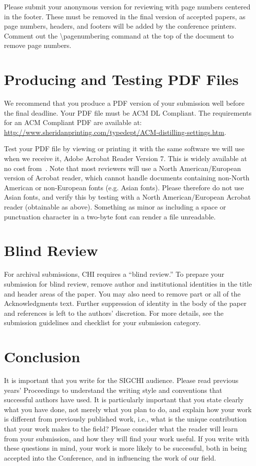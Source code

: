\documentclass{sigchi}
\begin{document}
Please submit your anonymous version for reviewing with page numbers
centered in the footer.  These must be removed in the final version of
accepted papers, as page numbers, headers, and footers will be added
by the conference printers.  Comment out the {\textbackslash}pagenumbering
command at the top of the document to remove page numbers.

\section{Producing and Testing PDF Files}

We recommend that you produce a PDF version of your submission well
before the final deadline.  Your PDF file must be ACM DL
Compliant. The requirements for an ACM Compliant PDF are available at:
{\url{http://www.sheridanprinting.com/typedept/ACM-distilling-settings.htm}}.

Test your PDF file by viewing or printing it with the same software we
will use when we receive it, Adobe Acrobat Reader Version 7. This is
widely available at no cost from~\cite{acrobat}.  Note that most
reviewers will use a North American/European version of Acrobat
reader, which cannot handle documents containing non-North American or
non-European fonts (e.g. Asian fonts).  Please therefore do not use
Asian fonts, and verify this by testing with a North American/European
Acrobat reader (obtainable as above). Something as minor as including
a space or punctuation character in a two-byte font can render a file
unreadable.

\section{Blind Review}

For archival submissions, CHI requires a ``blind review.'' To prepare
your submission for blind review, remove author and institutional
identities in the title and header areas of the paper. You may also
need to remove part or all of the Acknowledgments text.  Further
suppression of identity in the body of the paper and references is
left to the authors' discretion. For more details, see the submission
guidelines and checklist for your submission category.

\section{Conclusion}

It is important that you write for the SIGCHI audience.  Please read
previous years' Proceedings to understand the writing style and
conventions that successful authors have used.  It is particularly
important that you state clearly what you have done, not merely what
you plan to do, and explain how your work is different from previously
published work, i.e., what is the unique contribution that your work
makes to the field?  Please consider what the reader will learn from
your submission, and how they will find your work useful.  If you
write with these questions in mind, your work is more likely to be
successful, both in being accepted into the Conference, and in
influencing the work of our field.
\end{document}
